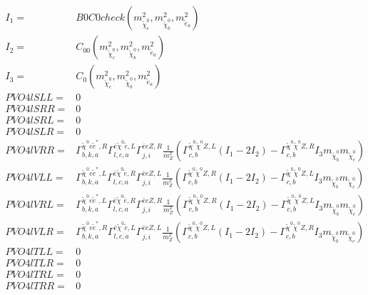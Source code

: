 \documentclass[A4,landscape]{article}
\begin{document}
\begin{align} 
I_1= & B0C0check(m^2_{\tilde{\chi}^0_{{c}}}, m^2_{\tilde{\chi}^0_{{b}}}, m^2_{\tilde{e}_{{a}}}) \\ 
I_2= & C_{00}(m^2_{\tilde{\chi}^0_{{c}}}, m^2_{\tilde{\chi}^0_{{b}}}, m^2_{\tilde{e}_{{a}}}) \\ 
I_3= & C_0(m^2_{\tilde{\chi}^0_{{c}}}, m^2_{\tilde{\chi}^0_{{b}}}, m^2_{\tilde{e}_{{a}}}) \\ 
  PVO4lSLL= & 0 \\ 
  PVO4lSRR= & 0 \\ 
  PVO4lSRL= & 0 \\ 
  PVO4lSLR= & 0 \\ 
  PVO4lVRR= &  \Gamma^{\tilde{\chi}^0 e \tilde{e}^*,R}_{b, k, a} \Gamma^{\bar{e}\tilde{\chi}^0 \tilde{e} ,L}_{l, c, a} \Gamma^{\bar{e}e Z ,R}_{j, i} \frac{1}{m^2_{Z}} (\Gamma^{\tilde{\chi}^0 \tilde{\chi}^0 Z ,L}_{c, b} (I_1 - 2 I_2) - \Gamma^{\tilde{\chi}^0 \tilde{\chi}^0 Z ,R}_{c, b} I_3 m_{\tilde{\chi}^0_{{b}}} m_{\tilde{\chi}^0_{{c}}}) \\ 
  PVO4lVLL= &  \Gamma^{\tilde{\chi}^0 e \tilde{e}^*,L}_{b, k, a} \Gamma^{\bar{e}\tilde{\chi}^0 \tilde{e} ,R}_{l, c, a} \Gamma^{\bar{e}e Z ,L}_{j, i} \frac{1}{m^2_{Z}} (\Gamma^{\tilde{\chi}^0 \tilde{\chi}^0 Z ,R}_{c, b} (I_1 - 2 I_2) - \Gamma^{\tilde{\chi}^0 \tilde{\chi}^0 Z ,L}_{c, b} I_3 m_{\tilde{\chi}^0_{{b}}} m_{\tilde{\chi}^0_{{c}}}) \\ 
  PVO4lVRL= &  \Gamma^{\tilde{\chi}^0 e \tilde{e}^*,L}_{b, k, a} \Gamma^{\bar{e}\tilde{\chi}^0 \tilde{e} ,R}_{l, c, a} \Gamma^{\bar{e}e Z ,R}_{j, i} \frac{1}{m^2_{Z}} (\Gamma^{\tilde{\chi}^0 \tilde{\chi}^0 Z ,R}_{c, b} (I_1 - 2 I_2) - \Gamma^{\tilde{\chi}^0 \tilde{\chi}^0 Z ,L}_{c, b} I_3 m_{\tilde{\chi}^0_{{b}}} m_{\tilde{\chi}^0_{{c}}}) \\ 
  PVO4lVLR= &  \Gamma^{\tilde{\chi}^0 e \tilde{e}^*,R}_{b, k, a} \Gamma^{\bar{e}\tilde{\chi}^0 \tilde{e} ,L}_{l, c, a} \Gamma^{\bar{e}e Z ,L}_{j, i} \frac{1}{m^2_{Z}} (\Gamma^{\tilde{\chi}^0 \tilde{\chi}^0 Z ,L}_{c, b} (I_1 - 2 I_2) - \Gamma^{\tilde{\chi}^0 \tilde{\chi}^0 Z ,R}_{c, b} I_3 m_{\tilde{\chi}^0_{{b}}} m_{\tilde{\chi}^0_{{c}}}) \\ 
  PVO4lTLL= & 0 \\ 
  PVO4lTLR= & 0 \\ 
  PVO4lTRL= & 0 \\ 
  PVO4lTRR= & 0 \\ 
\end{align} 
\end{document}
